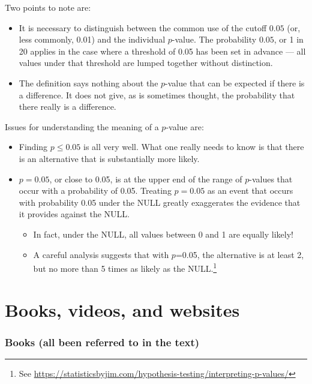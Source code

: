 \documentclass[
  10pt,
  b5paper]{book}
\providecommand{\tightlist}{%
  \setlength{\itemsep}{0pt}\setlength{\parskip}{0pt}}
\begin{document}
Two points to note are:

\begin{itemize}
\tightlist
\item
  It is necessary to distinguish between the common use of the
  cutoff \(0.05\) (or, less commonly, 0.01) and the individual \(p\)-value.
  The probability \(0.05\), or 1 in 20 applies in the case where
  a threshold of 0.05 has been set in advance --- all values
  under that threshold are lumped together without distinction.
\item
  The definition says nothing about the \(p\)-value that can be expected
  if there is a difference. It does not give, as is sometimes thought,
  the probability that there really is a difference.
\end{itemize}

Issues for understanding the meaning of a \(p\)-value are:

\begin{itemize}
\tightlist
\item
  Finding \(p \leq 0.05\) is all very well. What one really
  needs to know is that there is an alternative that is
  substantially more likely.
\item
  \(p = 0.05\), or close to 0.05, is at the upper end of the range
  of \(p\)-values that occur with a probability of 0.05. Treating
  \(p = 0.05\) as an event that occurs with probability 0.05 under
  the NULL greatly exaggerates the evidence that it provides
  against the NULL.

  \begin{itemize}
  \tightlist
  \item
    In fact, under the NULL, all values between 0 and 1 are
    equally likely!
  \item
    A careful analysis suggests that with \(p\)=0.05, the
    alternative is at least 2, but no more than 5 times as
    likely as the
    NULL.\footnote{See \url{https://statisticsbyjim.com/hypothesis-testing/interpreting-p-values/}}
  \end{itemize}
\end{itemize}

\backmatter

\hypertarget{app:more}{%
\chapter{Books, videos, and websites}\label{app:more}}

\hypertarget{books-all-been-referred-to-in-the-text}{%
\subsection{Books (all been referred to in the text)}\label{books-all-been-referred-to-in-the-text}}
\end{document}
